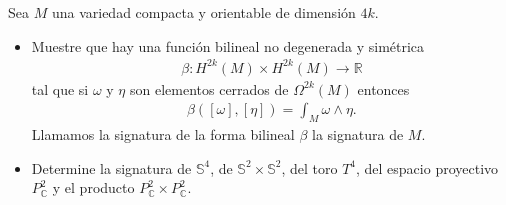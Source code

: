 \documentclass[11pt]{article}
\newcommand{\R}{\mathbb{R}}
\newcommand{\C}{\mathbb{C}}
\newcommand{\Ss}{\mathbb{S}}
\newcommand{\paint}[1]{\color{color}{#1}}
\newenvironment{exercise}[2][Ejercicio]{\begin{trivlist}
\item[\hskip \labelsep \paint{{\bfseries #1}}\hskip \labelsep {\bfseries #2.}]}{\end{trivlist}}
\begin{document}
\begin{exercise}{6} Sea $M$ una variedad compacta y orientable de dimensión $4k$.
\begin{itemize}[listparindent = \parindent]
\item[(a)] Muestre que hay una función bilineal no degenerada y simétrica
\begin{align*}
\beta : H^{2k}(M) \times H^{2k}(M) \to \R
\end{align*}
tal que si $\omega$ y $\eta$ son elementos cerrados de $\Omega^{2k}(M)$ entonces 
\begin{align*}
\beta([\omega],[\eta]) = \int_M \omega \wedge \eta.
\end{align*}
Llamamos la signatura de la forma bilineal $\beta$ la signatura de $M$.
\item[(b)] Determine la signatura de $\Ss^4$, de $\Ss^2 \times \Ss^2$, del toro $T^4$, del espacio proyectivo $P_{\C}^2$ y el producto $P_{\C}^2 \times P_{\C}^2$.
\end{itemize}
\end{exercise}
\end{document}
